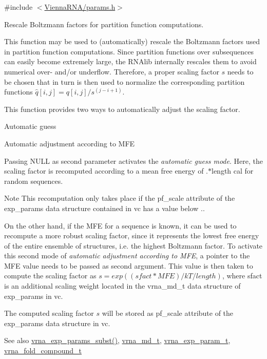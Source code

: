 {\ttfamily \#include $<$\mbox{\hyperlink{params_8h}{Vienna\+R\+N\+A/params.\+h}}$>$}



Rescale Boltzmann factors for partition function computations. 

This function may be used to (automatically) rescale the Boltzmann factors used in partition function computations. Since partition functions over subsequences can easily become extremely large, the R\+N\+Alib internally rescales them to avoid numerical over-\/ and/or underflow. Therefore, a proper scaling factor $s$ needs to be chosen that in turn is then used to normalize the corresponding partition functions $\hat{q}[i,j] = q[i,j] / s^{(j-i+1)}$.

This function provides two ways to automatically adjust the scaling factor.
\begin{DoxyEnumerate}
\item Automatic guess
\item Automatic adjustment according to M\+FE
\end{DoxyEnumerate}

Passing {\ttfamily N\+U\+LL} as second parameter activates the {\itshape automatic guess mode}. Here, the scaling factor is recomputed according to a mean free energy of {.$\ast$length} cal for random sequences. \begin{DoxyNote}{Note}
This recomputation only takes place if the {\ttfamily pf\+\_\+scale} attribute of the {\ttfamily exp\+\_\+params} data structure contained in {\ttfamily vc} has a value below {.}.
\end{DoxyNote}
On the other hand, if the M\+FE for a sequence is known, it can be used to recompute a more robust scaling factor, since it represents the lowest free energy of the entire ensemble of structures, i.\+e. the highest Boltzmann factor. To activate this second mode of {\itshape automatic adjustment according to M\+FE}, a pointer to the M\+FE value needs to be passed as second argument. This value is then taken to compute the scaling factor as $ s = exp((sfact * MFE) / kT / length )$, where sfact is an additional scaling weight located in the vrna\+\_\+md\+\_\+t data structure of {\ttfamily exp\+\_\+params} in {\ttfamily vc}.

The computed scaling factor $s$ will be stored as {\ttfamily pf\+\_\+scale} attribute of the {\ttfamily exp\+\_\+params} data structure in {\ttfamily vc}.

\begin{DoxySeeAlso}{See also}
\mbox{\hyperlink{group__energy__parameters_ga8e7ac4fab3b0cc03afbc134eaafb3525}{vrna\+\_\+exp\+\_\+params\+\_\+subst()}}, \mbox{\hyperlink{group__model__details_ga1f8a10e12a0a1915f2a4eff0b28ea17c}{vrna\+\_\+md\+\_\+t}}, \mbox{\hyperlink{group__energy__parameters_ga01d8b92fe734df8d79a6169482c7d8d8}{vrna\+\_\+exp\+\_\+param\+\_\+t}}, \mbox{\hyperlink{group__fold__compound_ga1b0cef17fd40466cef5968eaeeff6166}{vrna\+\_\+fold\+\_\+compound\+\_\+t}}
\end{DoxySeeAlso}

